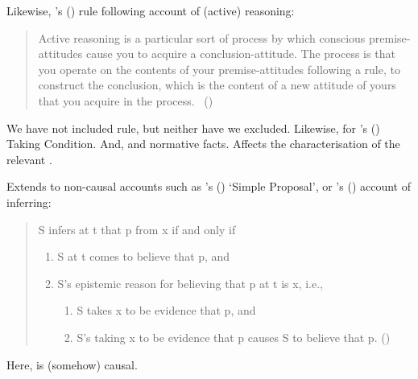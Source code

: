 \begin{note}
  Likewise, \citeauthor{Broome:2002aa}'s (\citeyear{Broome:2013aa}) rule following account of (active) reasoning:
  \begin{quote}
    Active reasoning is a particular sort of process by which conscious premise-attitudes cause you to acquire a conclusion-attitude.
    The process is that you operate on the contents of your premise-attitudes following a rule, to construct the conclusion, which is the content of a new attitude of yours that you acquire in the process.%
    \mbox{ }\hfill\mbox{(\citeyear[234]{Broome:2002aa})}
  \end{quote}
  We have not included rule, but neither have we excluded.
  Likewise, for \citeauthor{Boghossian:2014aa}'s (\citeyear{Boghossian:2014aa}) Taking Condition.
  And, \textcite{Wedgwood:2006ui} and normative facts.
  Affects the characterisation of the relevant \pool{}.


  Extends to non-causal accounts such as \citeauthor{Wright:2014tt}'s (\citeyear{Wright:2014tt}) `Simple Proposal', or
  \citeauthor{Longino:1978wv}'s (\citeyear{Longino:1978wv}) account of inferring:
  \begin{quote}
    S infers at t that p from x if and only if
    \begin{enumerate}[label=\arabic*.]
    \item
      S at t comes to believe that p, and
    \item
      S's epistemic reason for believing that p at t is x, i.e.,
      \begin{enumerate}[label=\alph*.]
      \item
        S takes x to be evidence that p, and
      \item
        S's taking x to be evidence that p causes S to believe that p.\newline
        \mbox{}\hfill\mbox{(\citeyear[22]{Longino:1978wv})}
      \end{enumerate}
    \end{enumerate}
  \end{quote}
  Here, \ros{} is (somehow) causal.


\end{note}
